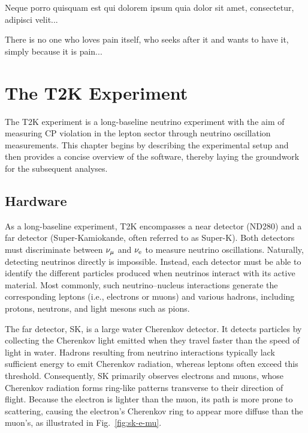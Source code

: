 \begin{savequote}[8cm]
\textlatin{Neque porro quisquam est qui dolorem ipsum quia dolor sit amet, consectetur, adipisci velit...}

There is no one who loves pain itself, who seeks after it and wants to have it, simply because it is pain...
\end{savequote}

\chapter{\label{ch:t2k}The T2K Experiment} 

\minitoc
The T2K experiment is a long-baseline neutrino experiment with the aim of measuring CP violation in the lepton sector through neutrino oscillation measurements.  
This chapter begins by describing the experimental setup and then provides a concise overview of the software, thereby laying the groundwork for the subsequent analyses.

\section{Hardware}
As a long-baseline experiment, T2K encompasses a near detector (ND280) and a far detector (Super-Kamiokande, often referred to as Super-K).  
Both detectors must discriminate between \(\nu_{\mu}\) and \(\nu_{\textrm{e}}\) to measure neutrino oscillations.  
Naturally, detecting neutrinos directly is impossible.  
Instead, each detector must be able to identify the different particles produced when neutrinos interact with its active material.  
Most commonly, such neutrino–nucleus interactions generate the corresponding leptons (i.e., electrons or muons) and various hadrons, including protons, neutrons, and light mesons such as pions.

The far detector, SK, is a large water Cherenkov detector.  
It detects particles by collecting the Cherenkov light emitted when they travel faster than the speed of light in water.  
Hadrons resulting from neutrino interactions typically lack sufficient energy to emit Cherenkov radiation, whereas leptons often exceed this threshold.  
Consequently, SK primarily observes electrons and muons, whose Cherenkov radiation forms ring-like patterns transverse to their direction of flight.  
Because the electron is lighter than the muon, its path is more prone to scattering, causing the electron’s Cherenkov ring to appear more diffuse than the muon’s, as illustrated in Fig.~\ref{fig:sk-e-mu}.

